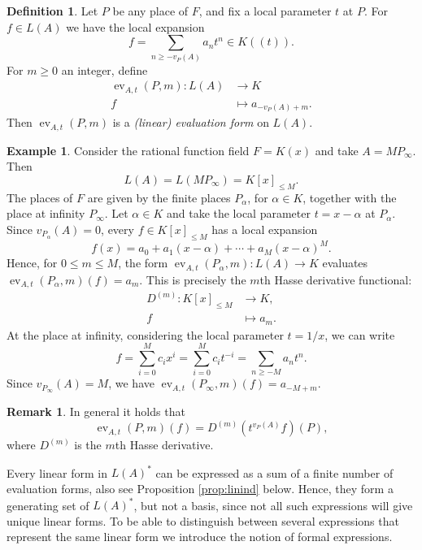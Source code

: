 \documentclass[12pt]{amsart}
\DeclareMathOperator{\ev}{ev}
\theoremstyle{definition}
\newtheorem{definition}[theorem]{Definition}
\newtheorem{example}[theorem]{Example}
\newtheorem{remark}[theorem]{Remark}
\begin{document}
	\begin{definition}\label{def:functionals}
		Let $P$ be any place of $F$, and fix a local
		parameter $t$ at $P$. 
		For $f \in L(A)$ we have the local expansion
		$$f=\sum_{n\ge -v_P(A)} a_n t^n
		\in K(\!(t)\!). $$
		For $m\ge 0$ an integer, define
		\begin{align*}
			\ev_{A,t}(P,m):L(A)&\to K\\
			f&\mapsto a_{-v_P(A)+m}.
		\end{align*}
		Then $\ev_{A, t}(P, m)$ is a \textit{(linear) evaluation form} on $L(A)$.
	\end{definition}
	\begin{example}\label{ex:weight}
		Consider the rational
		function field $F=K(x)$ and take $A=MP_\infty$. Then
		$$L(A)=L(MP_\infty)=K[x]_{\le M}.$$
		The places of $F$ are given by the finite places $P_\alpha$, for
		$\alpha\in K$, together with the place at infinity $P_\infty$.
		Let $\alpha\in K$ and take the local parameter $t=x-\alpha$ at $P_\alpha$.
		Since $v_{P_\alpha}(A)=0$, every $f\in K[x]_{\le M}$ has a local expansion
		$$f(x)=a_0+a_1(x-\alpha)+\cdots+a_M(x-\alpha)^M.$$
		Hence, for $0\le m\le M$, the form $ \ev_{A,t}(P_\alpha,m):L(A)\to K$
		evaluates $\ev_{A,t}(P_\alpha,m) (f)=a_m$. This is precisely the $m$th Hasse derivative functional:
		\begin{align*}
			D^{(m)} :K[x]_{\le M}&\to K,\\
			f&\mapsto a_m.
		\end{align*}
		At the place at infinity, considering the local parameter $t=1/x$, we can write
		$$ f=\sum_{i=0}^M c_i x^i =\sum_{i=0}^M c_i t^{-i}=\sum_{n\ge -M} a_n t^n.$$
		Since $v_{P_\infty}(A)=M$, we have
		$\ev_{A,t}(P_\infty,m) (f) =a_{-M+m} $.
	\end{example}
	\begin{remark} \label{rem:hasse}
		In general it holds that 
		$$\ev_{A, t}(P, m)(f) = D^{(m)} \left( t^{v_P(A)} f \right)(P),$$
		where $D^{(m)}$ is the $m$th Hasse derivative. 
	\end{remark}
	Every linear form in $L(A)^\ast$ can be expressed as a sum of a finite number of evaluation forms, also see Proposition \ref{prop:linind} below. Hence, they form a generating set of $L(A)^\ast$, but not a basis, since not all such expressions will give unique linear forms. To be able to distinguish between several expressions that represent the same linear form we introduce the notion of formal expressions. 
	
\end{document}
